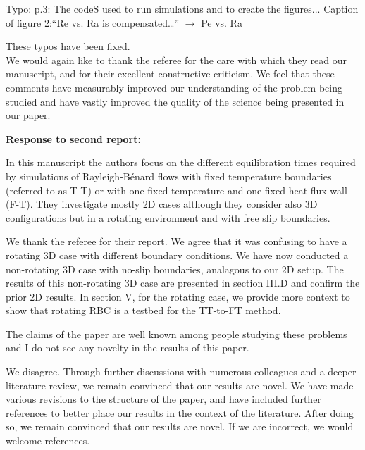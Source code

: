 \documentclass[aps, 11pt, singlecolumn]{revtex4-1} %
\begin{document}
\begin{singlespace}
\begin{myquotation}
Typo:
p.3: The codeS used to run simulations and to create the figures...
Caption of figure 2:``Re vs. Ra is compensated…'' $\rightarrow$ Pe vs. Ra
\end{myquotation}
These typos have been fixed.
\\

\vspace{0.5cm}
We would again like to thank the referee for the care with which they read our manuscript, and for their excellent constructive criticism.
We feel that these comments have measurably improved our understanding of the problem being studied and have vastly improved the quality of the science being presented in our paper.

\newpage
\noindent
\Large{\textbf{Response to second report:}}\newline$\,$\newline\indent
\begin{myquotation}
In this manuscript the authors focus on the different equilibration times required by simulations of Rayleigh-B\'{e}nard flows with fixed temperature boundaries (referred to as T-T) or with one fixed temperature and one fixed heat flux wall (F-T). 
They investigate mostly 2D cases although they consider also 3D configurations but in a rotating environment and with free slip boundaries. 
\end{myquotation}
We thank the referee for their report.
We agree that it was confusing to have a rotating 3D case with different boundary conditions.
We have now conducted a non-rotating 3D case with no-slip boundaries, analagous to our 2D setup.
The results of this non-rotating 3D case are presented in section III.D and confirm the prior 2D results.
In section V, for the rotating case, we provide more context to show that rotating RBC is a testbed for the TT-to-FT method.

\begin{myquotation}
The claims of the paper are well known among people studying these problems and I do not see any novelty in the results of this paper. 
\end{myquotation}
We disagree.
Through further discussions with numerous colleagues and a deeper literature review, we remain convinced that our results are novel.
We have made various revisions to the structure of the paper, and have included further references to better place our results in the context of the literature.
After doing so, we remain convinced that our results are novel.
If we are incorrect, we would welcome references.


\end{singlespace}
\end{document}
